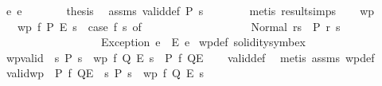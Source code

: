 \begin{isabellebody}
\ {\isacharparenleft}{\kern0pt}e\ e{\isacharparenright}{\kern0pt}\isanewline
\ \ \ \ \isamarkupfalse%
\ \isamarkupfalse%
\ {\isacharquery}{\kern0pt}thesis\ \isamarkupfalse%
\ assms\ valid{\isacharunderscore}{\kern0pt}def\ {\isacartoucheopen}P\ s{\isacartoucheclose}\isanewline
\ \ \ \ \ \ \isamarkupfalse%
\ {\isacharparenleft}{\kern0pt}metis\ result{\isachardot}{\kern0pt}simps{\isacharparenleft}{\kern0pt}{}{\isacharparenright}{\kern0pt}{\isacharparenright}{\kern0pt}\isanewline
\ \ \isamarkupfalse%
\isanewline
{}\isamarkupfalse%
%
\endisatagproof
{\isafoldproof}%
%
\isadelimproof
\isanewline
%
\endisadelimproof
\isanewline
{}\isamarkupfalse%
\ wp\isanewline
\ \ \ {\isachardoublequoteopen}wp\ f\ P\ E\ s\ {\isasymequiv}\ {\isacharparenleft}{\kern0pt}case\ f\ s\ of\isanewline
\ \ \ \ \ \ \ \ \ \ \ \ \ \ \ \ \ \ \ Normal\ {\isacharparenleft}{\kern0pt}r{\isacharcomma}{\kern0pt}s{\isacharprime}{\kern0pt}{\isacharparenright}{\kern0pt}\ {\isasymRightarrow}\ P\ r\ s{\isacharprime}{\kern0pt}\isanewline
\ \ \ \ \ \ \ \ \ \ \ \ \ \ \ \ \ {\isacharbar}{\kern0pt}\ Exception\ e\ {\isasymRightarrow}\ E\ e{\isacharparenright}{\kern0pt}{\isachardoublequoteclose}\isanewline
\isanewline
{}\isamarkupfalse%
\ wp{\isacharunderscore}{\kern0pt}def\ {\isacharbrackleft}{\kern0pt}solidity{\isacharunderscore}{\kern0pt}symbex{\isacharbrackright}{\kern0pt}\isanewline
\isanewline
{}\isamarkupfalse%
\ wp{\isacharunderscore}{\kern0pt}valid{\isacharcolon}{\kern0pt}\ \ {\isachardoublequoteopen}{\isasymAnd}s{\isachardot}{\kern0pt}\ P\ s\ {\isasymLongrightarrow}\ {\isacharparenleft}{\kern0pt}wp\ f\ Q\ E\ s{\isacharparenright}{\kern0pt}{\isachardoublequoteclose}\ \ {\isachardoublequoteopen}{\isasymlbrace}P{\isasymrbrace}\ f\ {\isasymlbrace}Q{\isasymrbrace}{\isacharcomma}{\kern0pt}{\isasymlbrace}E{\isasymrbrace}{\isachardoublequoteclose}\isanewline
%
\isadelimproof
\ \ %
\endisadelimproof
%
\isatagproof
{}\isamarkupfalse%
\ valid{\isacharunderscore}{\kern0pt}def\ \isamarkupfalse%
\ {\isacharparenleft}{\kern0pt}metis\ assms\ wp{\isacharunderscore}{\kern0pt}def{\isacharparenright}{\kern0pt}%
\endisatagproof
{\isafoldproof}%
%
\isadelimproof
\isanewline
%
\endisadelimproof
\isanewline
{}\isamarkupfalse%
\ valid{\isacharunderscore}{\kern0pt}wp{\isacharcolon}{\kern0pt}\ \ {\isachardoublequoteopen}{\isasymlbrace}P{\isasymrbrace}\ f\ {\isasymlbrace}Q{\isasymrbrace}{\isacharcomma}{\kern0pt}{\isasymlbrace}E{\isasymrbrace}{\isachardoublequoteclose}\ \ {\isachardoublequoteopen}{\isasymAnd}s{\isachardot}{\kern0pt}\ P\ s\ {\isasymLongrightarrow}\ {\isacharparenleft}{\kern0pt}wp\ f\ Q\ E\ s{\isacharparenright}{\kern0pt}{\isachardoublequoteclose}\isanewline

\end{isabellebody}
